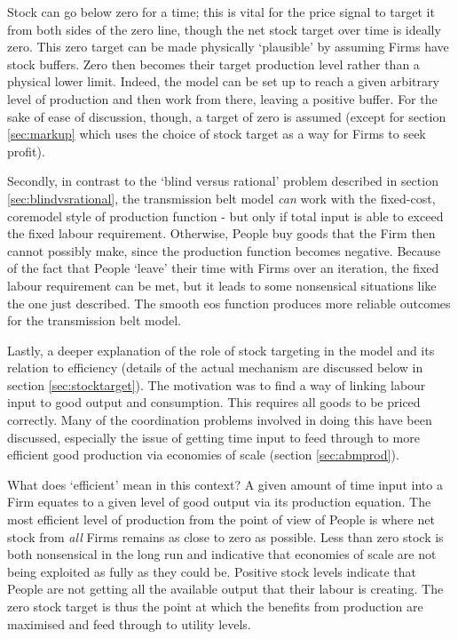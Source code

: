Stock can go below zero for a time; this is vital for the price signal to target it from both sides of the zero line, though the net stock target over time is ideally zero. This zero target can be made physically `plausible' by assuming Firms have stock buffers. Zero then becomes their target production level rather than a physical lower limit. Indeed, the model can be set up to reach a given arbitrary level of production and then work from there, leaving a positive buffer. For the sake of ease of discussion, though, a target of zero is assumed (except for section \ref{sec:markup} which uses the choice of stock target as a way for Firms to seek profit).

Secondly, in contrast to the `blind versus rational' problem described in section \ref{sec:blindvsrational}, the transmission belt model \emph{can} work with the fixed-cost, \gls{coremodel} style of production function - but only if total input is able to exceed the fixed labour requirement. Otherwise, People buy goods that the Firm then cannot possibly make, since the production function becomes negative. Because of the fact that People `leave' their time with Firms over an iteration, the fixed labour requirement can be met, but it leads to some nonsensical situations like the one just described. The smooth \gls{eos} function produces more reliable outcomes for the transmission belt model.

Lastly, a deeper explanation of the role of stock targeting in the model and its relation to efficiency (details of the actual mechanism are discussed below in section \ref{sec:stocktarget}). The motivation was to find a way of linking labour input to good output and consumption. This requires all goods to be priced correctly. Many of the coordination problems involved in doing this have been discussed, especially the issue of getting time input to feed through to more efficient good production via economies of scale (section \ref{sec:abmprod}). 

What does `efficient' mean in this context? A given amount of time input into a Firm equates to a given level of good output via its production equation. The most efficient level of production from the point of view of People is where net stock from \emph{all} Firms remains as close to zero as possible. Less than zero stock is both nonsensical in the long run and indicative that economies of scale are not being exploited as fully as they could be. Positive stock levels indicate that People are not getting all the available output that their labour is creating. The zero stock target is thus the point at which the benefits from production are maximised and feed through to utility levels.

